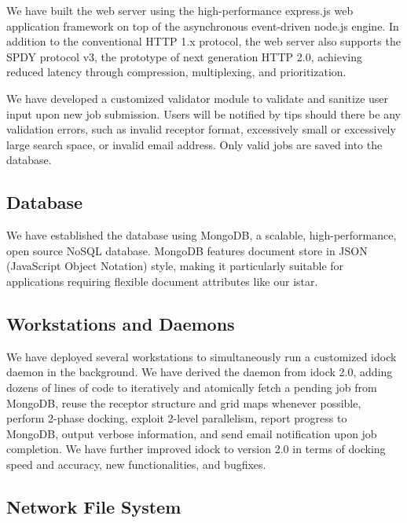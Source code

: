 \documentclass[12pt]{article}
\begin{document}
We have built the web server using the high-performance express.js web application framework on top of the asynchronous event-driven node.js engine. In addition to the conventional HTTP 1.x protocol, the web server also supports the SPDY protocol v3, the prototype of next generation HTTP 2.0, achieving reduced latency through compression, multiplexing, and prioritization.

We have developed a customized validator module to validate and sanitize user input upon new job submission. Users will be notified by tips should there be any validation errors, such as invalid receptor format, excessively small or excessively large search space, or invalid email address. Only valid jobs are saved into the database.

\subsection*{\sffamily \large Database}

We have established the database using MongoDB, a scalable, high-performance, open source NoSQL database. MongoDB features document store in JSON (JavaScript Object Notation) style, making it particularly suitable for applications requiring flexible document attributes like our istar. 

\subsection*{\sffamily \large Workstations and Daemons}

We have deployed several workstations to simultaneously run a customized idock daemon in the background. We have derived the daemon from idock 2.0, adding dozens of lines of code to iteratively and atomically fetch a pending job from MongoDB, reuse the receptor structure and grid maps whenever possible, perform 2-phase docking, exploit 2-level parallelism, report progress to MongoDB, output verbose information, and send email notification upon job completion. We have further improved idock to version 2.0 in terms of docking speed and accuracy, new functionalities, and bugfixes.

\subsection*{\sffamily \large Network File System}
\end{document}
